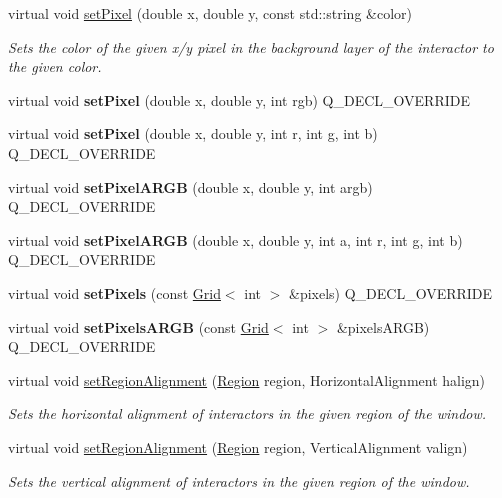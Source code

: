 \begin{DoxyCompactItemize}
virtual void \mbox{\hyperlink{classGDrawingSurface_a09f9640e4ff7388dcfc391efd88d2415}{set\+Pixel}} (double x, double y, const std\+::string \&color)
\begin{DoxyCompactList}\small\item\em Sets the color of the given x/y pixel in the background layer of the interactor to the given color. \end{DoxyCompactList}\item 
virtual void {\bfseries set\+Pixel} (double x, double y, int rgb) Q\+\_\+\+D\+E\+C\+L\+\_\+\+O\+V\+E\+R\+R\+I\+DE
\item 
virtual void {\bfseries set\+Pixel} (double x, double y, int r, int g, int b) Q\+\_\+\+D\+E\+C\+L\+\_\+\+O\+V\+E\+R\+R\+I\+DE
\item 
virtual void {\bfseries set\+Pixel\+A\+R\+GB} (double x, double y, int argb) Q\+\_\+\+D\+E\+C\+L\+\_\+\+O\+V\+E\+R\+R\+I\+DE
\item 
virtual void {\bfseries set\+Pixel\+A\+R\+GB} (double x, double y, int a, int r, int g, int b) Q\+\_\+\+D\+E\+C\+L\+\_\+\+O\+V\+E\+R\+R\+I\+DE
\item 
virtual void {\bfseries set\+Pixels} (const \mbox{\hyperlink{classGrid}{Grid}}$<$ int $>$ \&pixels) Q\+\_\+\+D\+E\+C\+L\+\_\+\+O\+V\+E\+R\+R\+I\+DE
\item 
virtual void {\bfseries set\+Pixels\+A\+R\+GB} (const \mbox{\hyperlink{classGrid}{Grid}}$<$ int $>$ \&pixels\+A\+R\+GB) Q\+\_\+\+D\+E\+C\+L\+\_\+\+O\+V\+E\+R\+R\+I\+DE
\item 
virtual void \mbox{\hyperlink{classGWindow_a96e9f5593c0193bbdc7ae99945b9cf5f}{set\+Region\+Alignment}} (\mbox{\hyperlink{classGWindow_a81a01a86de31071a92e6cce0bab9bc4b}{Region}} region, Horizontal\+Alignment halign)
\begin{DoxyCompactList}\small\item\em Sets the horizontal alignment of interactors in the given region of the window. \end{DoxyCompactList}\item 
virtual void \mbox{\hyperlink{classGWindow_a926942899d029fc9921fe770ac2867bb}{set\+Region\+Alignment}} (\mbox{\hyperlink{classGWindow_a81a01a86de31071a92e6cce0bab9bc4b}{Region}} region, Vertical\+Alignment valign)
\begin{DoxyCompactList}\small\item\em Sets the vertical alignment of interactors in the given region of the window. \end{DoxyCompactList}\item 

\end{DoxyCompactItemize}
